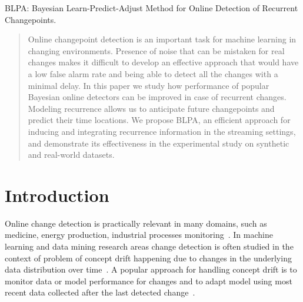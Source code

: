 BLPA: Bayesian Learn-Predict-Adjust Method for Online  Detection of Recurrent Changepoints.

\begin{abstract}
Online changepoint detection is an important task for machine learning in changing environments.
Presence of noise that can be mistaken for real changes makes it difficult to develop an effective approach that would have a low false alarm rate and being able to detect all the changes with a minimal delay.
In this paper we study how performance of popular Bayesian online detectors can be improved in case of recurrent changes. Modeling recurrence allows us to anticipate future changepoints and predict their time locations.
We propose BLPA, an efficient approach for inducing and integrating recurrence information in the streaming settings, and demonstrate its effectiveness in the experimental study on synthetic and real-world datasets.
\end{abstract}

\section{Introduction}
Online change detection is practically relevant in many domains, such as medicine, energy production, industrial processes monitoring~\cite{Nikiforov}.
In machine learning and data mining research areas change detection is often studied in the context of problem of concept drift happening due to changes in the underlying data distribution over time~\cite{Widmer96}. A popular approach for handling concept drift is to monitor data or model performance for changes and to adapt model using most recent data collected after the last detected change~\cite{GamaACMCS2014}.

